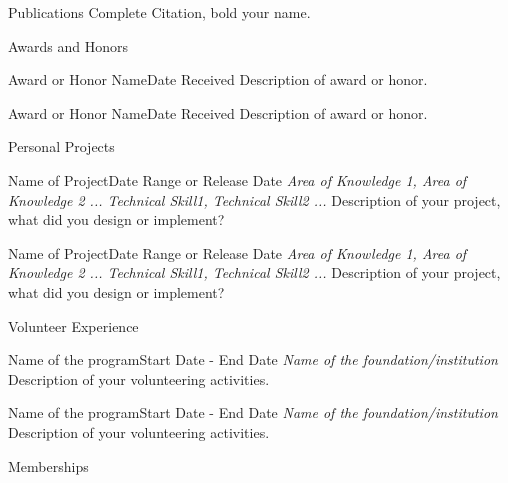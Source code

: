 \documentclass[10pt, letterpaper]{article}
\begin{document}
    \begin{profsection}{Publications}
        Complete Citation, bold your name.
    \end{profsection}    

    \begin{profsection}{Awards and Honors}
    
        \begin{profsubsection}{Award or Honor Name}{Date Received} 
            Description of award or honor.
        \end{profsubsection}
    
        \begin{profsubsection}{Award or Honor Name}{Date Received} 
            Description of award or honor.
        \end{profsubsection}
    
    \end{profsection}

    \begin{profsection}{Personal Projects}
        \begin{profsubsection}{Name of Project}{Date Range or Release Date} 
            \textit{Area of Knowledge 1, Area of Knowledge 2 ... \hfill Technical Skill1, Technical Skill2 ...}
            Description of your project, what did you design or implement?
        \end{profsubsection}
        
        \begin{profsubsection}{Name of Project}{Date Range or Release Date} 
            \textit{Area of Knowledge 1, Area of Knowledge 2 ... \hfill Technical Skill1, Technical Skill2 ...}
            Description of your project, what did you design or implement?
        \end{profsubsection}   
    \end{profsection}    
    
    \begin{profsection}{Volunteer Experience}
        \begin{profsubsection}{Name of the program}{Start Date - End Date}
            \textit{Name of the foundation/institution}  \newline
            Description of your volunteering activities.        
        \end{profsubsection} 
        \begin{profsubsection}{Name of the program}{Start Date - End Date}
            \textit{Name of the foundation/institution}  \newline
            Description of your volunteering activities.        
        \end{profsubsection}  
    \end{profsection}

    \begin{profsection}{Memberships}
    \end{profsection}
    
\end{document}
